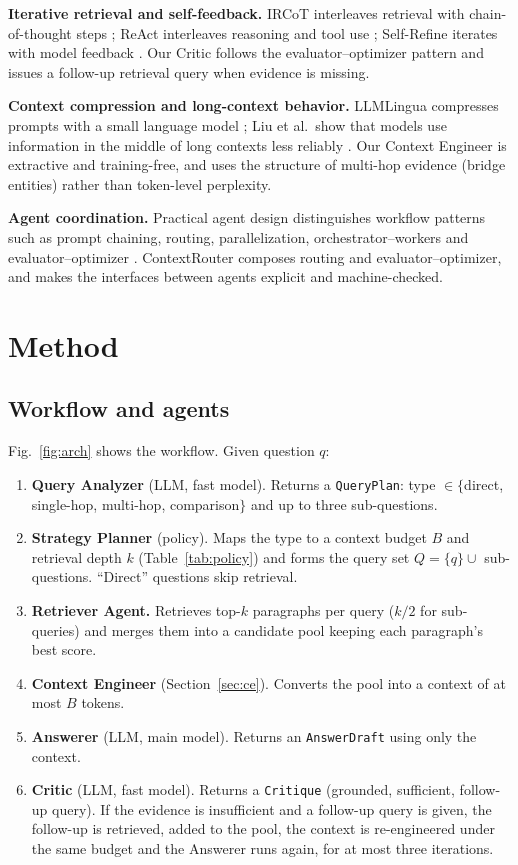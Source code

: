 \documentclass[conference]{IEEEtran}
\begin{document}
\textbf{Iterative retrieval and self-feedback.} IRCoT interleaves retrieval with chain-of-thought steps
\cite{trivedi2023ircot}; ReAct interleaves reasoning and tool use \cite{yao2023react}; Self-Refine iterates with
model feedback \cite{madaan2023selfrefine}. Our Critic follows the evaluator--optimizer pattern and issues a
follow-up retrieval query when evidence is missing.

\textbf{Context compression and long-context behavior.} LLMLingua compresses prompts with a small language model
\cite{jiang2023llmlingua}; Liu et al.\ show that models use information in the middle of long contexts less
reliably \cite{liu2024lost}. Our Context Engineer is extractive and training-free, and uses the structure of
multi-hop evidence (bridge entities) rather than token-level perplexity.

\textbf{Agent coordination.} Practical agent design distinguishes workflow patterns such as prompt chaining,
routing, parallelization, orchestrator--workers and evaluator--optimizer \cite{anthropic2024agents}. ContextRouter
composes routing and evaluator--optimizer, and makes the interfaces between agents explicit and machine-checked.

\section{Method}
\subsection{Workflow and agents}
Fig.~\ref{fig:arch} shows the workflow. Given question $q$:
\begin{enumerate}
\item \textbf{Query Analyzer} (LLM, fast model). Returns a \texttt{QueryPlan}: type
$\in\{$direct, single-hop, multi-hop, comparison$\}$ and up to three sub-questions.
\item \textbf{Strategy Planner} (policy). Maps the type to a context budget $B$ and retrieval depth $k$
(Table~\ref{tab:policy}) and forms the query set $Q=\{q\}\cup$ sub-questions. ``Direct'' questions skip retrieval.
\item \textbf{Retriever Agent.} Retrieves top-$k$ paragraphs per query ($k/2$ for sub-queries) and merges them into a
candidate pool keeping each paragraph's best score.
\item \textbf{Context Engineer} (Section~\ref{sec:ce}). Converts the pool into a context of at most $B$ tokens.
\item \textbf{Answerer} (LLM, main model). Returns an \texttt{AnswerDraft} using only the context.
\item \textbf{Critic} (LLM, fast model). Returns a \texttt{Critique} (grounded, sufficient, follow-up query). If the
evidence is insufficient and a follow-up query is given, the follow-up is retrieved, added to the pool, the context is
re-engineered under the same budget and the Answerer runs again, for at most three iterations.
\end{enumerate}
\end{document}
